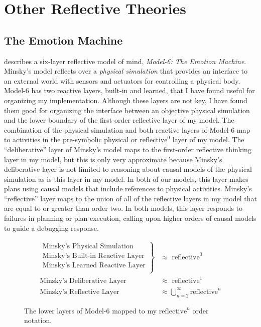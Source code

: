 \chapter{Other Reflective Theories}
\label{chapter:other_reflective_theories}

\section{The Emotion Machine}
\label{backreference:self_reflective_self_conscious}

\cite{minsky:2006} describes a six-layer reflective model of mind,
\emph{\mbox{Model-6}: The Emotion Machine}.  Minsky's model reflects
over a \emph{physical simulation} that provides an interface to an
external world with sensors and actuators for controlling a physical
body.  \mbox{Model-6} has two reactive layers, built-in and learned,
that I have found useful for organizing my implementation.  Although
these layers are not key, I have found them good for organizing the
interface between an objective physical simulation and the lower
boundary of the first-order reflective layer of my model.  The
combination of the physical simulation and both reactive layers of
\mbox{Model-6} map to activities in the pre-symbolic physical or
$\text{reflective}^0$ layer of my model.  The ``deliberative'' layer
of Minsky's model maps to the first-order reflective thinking layer in
my model, but this is only very approximate because Minsky's
deliberative layer is not limited to reasoning about causal models of
the physical simulation as is this layer in my model.  In both of our
models, this layer makes plans using causal models that include
references to physical activities.  Minsky's ``reflective'' layer maps
to the union of all of the reflective layers in my model that are
equal to or greater than order two.  In both models, this layer
responds to failures in planning or plan execution, calling upon
higher orders of causal models to guide a debugging response.

\begin{figure}[bth]
\begin{align*}
\left.
  \begin{array}{l}
    \text{Minsky's Physical Simulation}\\
    \text{Minsky's Built-in Reactive Layer}\\
    \text{Minsky's Learned Reactive Layer}\\
  \end{array}
\right\}                            &{\approx} \text{ reflective}^0 \\
\text{Minsky's Deliberative Layer } &{\approx} \text{ reflective}^1 \\
\text{Minsky's Reflective Layer }   &{\approx} \bigcup_{n=2}^{\infty}{\text{reflective}^n}
\end{align*}
\caption{The lower layers of Model-6 mapped to my
  $\text{reflective}^n$ order notation.}
\label{figure:model_6_as_reflective_order_notation}
\end{figure}

